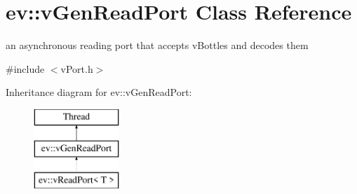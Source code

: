 \hypertarget{classev_1_1vGenReadPort}{}\section{ev\+:\+:v\+Gen\+Read\+Port Class Reference}
\label{classev_1_1vGenReadPort}


an asynchronous reading port that accepts v\+Bottles and decodes them  




{\ttfamily \#include $<$v\+Port.\+h$>$}

Inheritance diagram for ev\+:\+:v\+Gen\+Read\+Port\+:\begin{figure}[H]
\begin{center}
\leavevmode
\includegraphics[height=3.000000cm]{classev_1_1vGenReadPort}
\end{center}
\end{figure}
